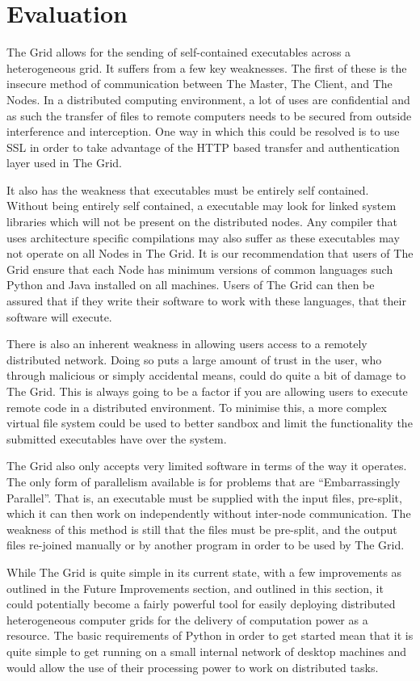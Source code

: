 \chapter{Evaluation}
The Grid allows for the sending of self-contained executables across a heterogeneous grid. It suffers from a few key weaknesses. The first of these is the insecure method of communication between The Master, The Client, and The Nodes. In a distributed computing environment, a lot of uses are confidential and as such the transfer of files to remote computers needs to be secured from outside interference and interception. One way in which this could be resolved is to use SSL in order to take advantage of the HTTP based transfer and authentication layer used in The Grid.

It also has the weakness that executables must be entirely self contained. Without being entirely self contained, a executable may look for linked system libraries which will not be present on the distributed nodes. Any compiler that uses architecture specific compilations may also suffer as these executables may not operate on all Nodes in The Grid. It is our recommendation that users of The Grid ensure that each Node has minimum versions of common languages such Python and Java installed on all machines. Users of The Grid can then be assured that if they write their software to work with these languages, that their software will execute. 

There is also an inherent weakness in allowing users access to a remotely distributed network. Doing so puts a large amount of trust in the user, who through malicious or simply accidental means, could do quite a bit of damage to The Grid. This is always going to be a factor if you are allowing users to execute remote code in a distributed environment. To minimise this, a more complex virtual file system could be used to better sandbox and limit the functionality the submitted executables have over the system. 

The Grid also only accepts very limited software in terms of the way it operates. The only form of parallelism available is for problems that are ``Embarrassingly Parallel''. That is, an executable must be supplied with the input files, pre-split, which it can then work on independently without inter-node communication. The weakness of this method is still that the files must be pre-split, and the output files re-joined manually or by another program in order to be used by The Grid. 

While The Grid is quite simple in its current state, with a few improvements as outlined in the Future Improvements section, and outlined in this section, it could potentially become a fairly powerful tool for easily deploying distributed heterogeneous computer grids for the delivery of computation power as a resource. The basic requirements of Python in order to get started mean that it is quite simple to get running on a small internal network of desktop machines and would allow the use of their processing power to work on distributed tasks. 
